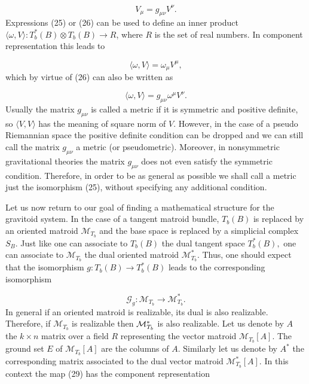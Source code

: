\documentclass[a4paper,12pt]{article}
\begin{document}
\begin{equation}
V_{\mu }=g_{\mu \nu }V^{\nu }.  \label{26}
\end{equation}
Expressions (25) or (26) can be used to define an inner product $\langle
\omega ,V\rangle :T_{b}^{\ast }(B)\otimes T_{b}(B)\rightarrow R$, where $R$
is the set of real numbers. In component representation this leads to

\begin{equation}
\langle \omega ,V\rangle =\omega _{\mu }V^{\mu },  \label{27}
\end{equation}
which by virtue of (26) can also be written as

\begin{equation}
\langle \omega ,V\rangle =g_{\mu \nu }\omega ^{\mu }V^{\nu }.  \label{28}
\end{equation}
Usually the matrix $g_{\mu \nu }$ is called a metric if it is symmetric and
positive definite, so $\langle V,V\rangle $ has the meaning of square norm
of $V$. However, in the case of a pseudo Riemannian space the positive
definite condition can be dropped and we can still call the matrix $g_{\mu
\nu }$ a metric (or pseudometric). Moreover, in nonsymmetric gravitational
theories the matrix $g_{\mu \nu }$ does not even satisfy the symmetric
condition. Therefore, in order to be as general as possible we shall call a
metric just the isomorphism (25), without specifying any additional
condition.

Let us now return to our goal of finding a mathematical structure for the
gravitoid system. In the case of a tangent matroid bundle, $T_{b}(B)$ is
replaced by an oriented matroid $\mathcal{M}_{T_{b}}$ and the base space is
replaced by a simplicial complex $S_{B}$. Just like one can associate to $%
T_{b}(B)$ the dual tangent space $T_{b}^{\ast }(B),$ one can associate to $%
\mathcal{M}_{T_{b}}$ the dual oriented matroid $\mathcal{M}_{T_{b}}^{\ast }.$
Thus, one should expect that the isomorphism $g:T_{b}(B)\rightarrow
T_{b}^{\ast }(B)$ leads to the corresponding isomorphism

\begin{equation}
\mathcal{G}_{g}:\mathcal{M}_{T_{b}}\rightarrow \mathcal{M}_{T_{b}}^{\ast }.
\label{29}
\end{equation}
In general if an oriented matroid is realizable, its dual is also
realizable. Therefore, if $\mathcal{M}_{T_{b}}$ is realizable then $\mathcal{%
M}_{T_{b}}^{\ast }$ is also realizable. Let us denote by $A$ the $k\times n$
matrix over a field $R$ representing the vector matroid $\mathcal{M}%
_{T_{b}}[A].$ The ground set $E$ of $\mathcal{M}_{T_{b}}[A]$ are the columns
of $A$. Similarly let us denote by $A^{\ast }$ the corresponding matrix
associated to the dual vector matroid $\mathcal{M}_{T_{b}}^{\ast }[A].$ In
this context the map (29) has the component representation
\end{document}
